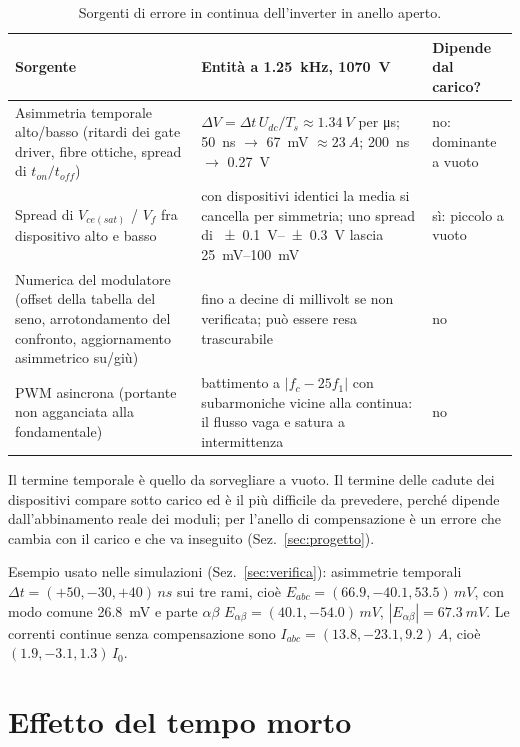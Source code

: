 \documentclass[10pt,a4paper]{scrartcl}
\newcommand{\Ts}{T_s}
\newcommand{\Izero}{I_0}
\newcommand{\ab}{\alpha\beta}
\newcommand{\Eab}{E_{\ab}}
\newcommand{\Udc}{U_{dc}}
\begin{document}
\begin{onehalfspace}
\begin{table}[H]
\centering\small
\begin{tabular}{@{}R{4.6cm}R{7.6cm}R{3.0cm}@{}}
\toprule
\textbf{Sorgente} & \textbf{Entità a \SI{1.25}{kHz}, \SI{1070}{V}} & \textbf{Dipende dal carico?} \\
\midrule
Asimmetria temporale alto/basso (ritardi dei gate driver, fibre ottiche, spread di $t_{on}/t_{off}$) & $\Delta V = \Delta t\,\Udc/\Ts \approx \SI{1.34}{V}$ per \si{\micro s}; \SI{50}{ns} $\to$ \SI{67}{mV} $\approx \SI{23}{A}$; \SI{200}{ns} $\to$ \SI{0.27}{V} & no: dominante a vuoto \\
Spread di $V_{ce(sat)}$ / $V_f$ fra dispositivo alto e basso & con dispositivi identici la media si cancella per simmetria; uno spread di \SIrange{\pm 0.1}{\pm 0.3}{V} lascia \SIrange{25}{100}{mV} & sì: piccolo a vuoto \\
Numerica del modulatore (offset della tabella del seno, arrotondamento del confronto, aggiornamento asimmetrico su/giù) & fino a decine di millivolt se non verificata; può essere resa trascurabile & no \\
PWM asincrona (portante non agganciata alla fondamentale) & battimento a $|f_c - 25 f_1|$ con subarmoniche vicine alla continua: il flusso vaga e satura a intermittenza & no \\
\bottomrule
\end{tabular}
\caption{Sorgenti di errore in continua dell'inverter in anello aperto.}
\label{tab:sorgenti}
\end{table}

Il termine temporale è quello da sorvegliare a vuoto. Il termine delle cadute dei dispositivi compare sotto carico ed è il più difficile da prevedere, perché dipende dall'abbinamento reale dei moduli; per l'anello di compensazione è un errore che cambia con il carico e che va inseguito (Sez.~\ref{sec:progetto}).

Esempio usato nelle simulazioni (Sez.~\ref{sec:verifica}): asimmetrie temporali $\Delta t = (+50, -30, +40)\,\si{ns}$ sui tre rami, cioè $E_{abc} = (\num{66.9}, \num{-40.1}, \num{53.5})\,\si{mV}$, con modo comune \SI{26.8}{mV} e parte $\alpha\beta$ $\Eab = (\num{40.1}, \num{-54.0})\,\si{mV}$, $|\Eab| = \SI{67.3}{mV}$. Le correnti continue senza compensazione sono $I_{abc} = (\num{13.8}, \num{-23.1}, \num{9.2})\,\si{A}$, cioè $(\num{1.9}, \num{-3.1}, \num{1.3})\,\Izero$.

\section{Effetto del tempo morto}
\label{sec:tempomorto}


\end{onehalfspace}
\end{document}
